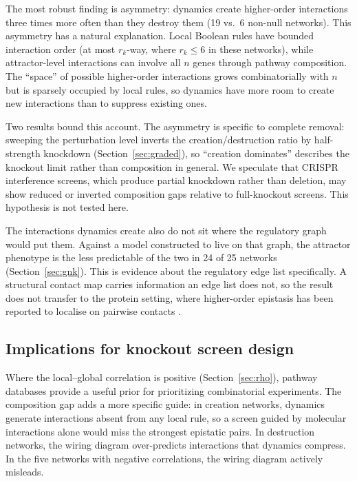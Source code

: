 \documentclass[10pt]{article}
\begin{document}
The most robust finding is asymmetry: dynamics create higher-order
interactions three times more often than they destroy them (19 vs.\ 6
non-null networks). This asymmetry has a natural explanation. Local
Boolean rules have bounded interaction order (at most $r_k$-way,
where $r_k \leq 6$ in these networks), while attractor-level
interactions can involve all $n$ genes through pathway composition.
The ``space'' of possible higher-order interactions grows
combinatorially with $n$ but is sparsely occupied by local rules,
so dynamics have more room to create new interactions than to
suppress existing ones.

Two results bound this account. The asymmetry is specific to complete
removal: sweeping the perturbation level inverts the creation/destruction
ratio by half-strength knockdown (Section~\ref{sec:graded}), so
``creation dominates'' describes the knockout limit rather than
composition in general. We speculate that CRISPR interference screens, which produce partial
knockdown rather than deletion, may show reduced or inverted composition
gaps relative to full-knockout screens. This hypothesis is not tested
here.

The interactions dynamics create also do not sit where the regulatory
graph would put them. Against a model constructed to live on that graph,
the attractor phenotype is the less predictable of the two in 24 of 25
networks (Section~\ref{sec:gnk}). This is evidence about the regulatory
edge list specifically. A structural contact map carries information an
edge list does not, so the result does not transfer to the protein
setting, where higher-order epistasis has been reported to localise on
pairwise contacts \citep{brookes2022sparsity}.

\subsection{Implications for knockout screen design}

Where the local--global correlation is positive
(Section~\ref{sec:rho}), pathway databases provide a useful prior
for prioritizing combinatorial experiments. The composition gap
adds a more specific guide: in creation networks, dynamics generate
interactions absent from any local rule, so a screen guided by
molecular interactions alone would miss the strongest epistatic
pairs. In destruction networks, the wiring diagram over-predicts
interactions that dynamics compress. In the five networks with
negative correlations, the wiring diagram actively misleads.
\end{document}
